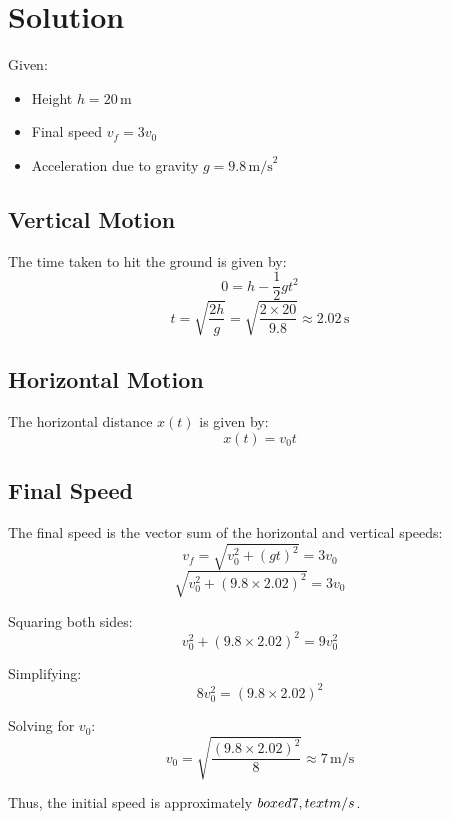 \documentclass{article}
\begin{document}
\section*{Solution}

Given:
\begin{itemize}
    \item Height \( h = 20 \, \text{m} \)
    \item Final speed \( v_f = 3v_0 \)
    \item Acceleration due to gravity \( g = 9.8 \, \text{m/s}^2 \)
\end{itemize}

\subsection*{Vertical Motion}
The time taken to hit the ground is given by:
\[
0 = h - \frac{1}{2}gt^2
\]
\[
t = \sqrt{\frac{2h}{g}} = \sqrt{\frac{2 \times 20}{9.8}} \approx 2.02 \, \text{s}
\]

\subsection*{Horizontal Motion}
The horizontal distance \( x(t) \) is given by:
\[
x(t) = v_0 t
\]

\subsection*{Final Speed}
The final speed is the vector sum of the horizontal and vertical speeds:
\[
v_f = \sqrt{v_0^2 + (gt)^2} = 3v_0
\]
\[
\sqrt{v_0^2 + (9.8 \times 2.02)^2} = 3v_0
\]

Squaring both sides:
\[
v_0^2 + (9.8 \times 2.02)^2 = 9v_0^2
\]

Simplifying:
\[
8v_0^2 = (9.8 \times 2.02)^2
\]

Solving for $v_0$:
\[
v_0 = \sqrt{\frac{(9.8 \times 2.02)^2}{8}} \approx 7 \, \text{m/s}
\]

Thus, the initial speed is approximately $\\boxed{7 \\, \\text{m/s}}$.
\end{document}
